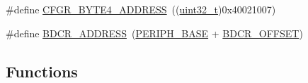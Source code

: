\begin{DoxyCompactItemize}
\item 
\#define \hyperlink{group___r_c_c___private___defines_ga5fea86b59ec4be059d922db57cca3b3f}{C\+F\+G\+R\+\_\+\+B\+Y\+T\+E4\+\_\+\+A\+D\+D\+R\+E\+SS}~((\hyperlink{_p_e___types_8h_a33594304e786b158f3fb30289278f5af}{uint32\+\_\+t})0x40021007)
\item 
\#define \hyperlink{group___r_c_c___private___defines_ga40b5a415d697b6af7babd8a208c92435}{B\+D\+C\+R\+\_\+\+A\+D\+D\+R\+E\+SS}~(\hyperlink{openmotestm_2library_2inc_2stm32f10x__map_8h_a9171f49478fa86d932f89e78e73b88b0}{P\+E\+R\+I\+P\+H\+\_\+\+B\+A\+SE} + \hyperlink{openmotestm_2library_2src_2stm32f10x__rcc_8c_a5f8a0c3cb5f5c835bf7eef09515138ad}{B\+D\+C\+R\+\_\+\+O\+F\+F\+S\+ET})
\end{DoxyCompactItemize}
\subsection*{Functions}
